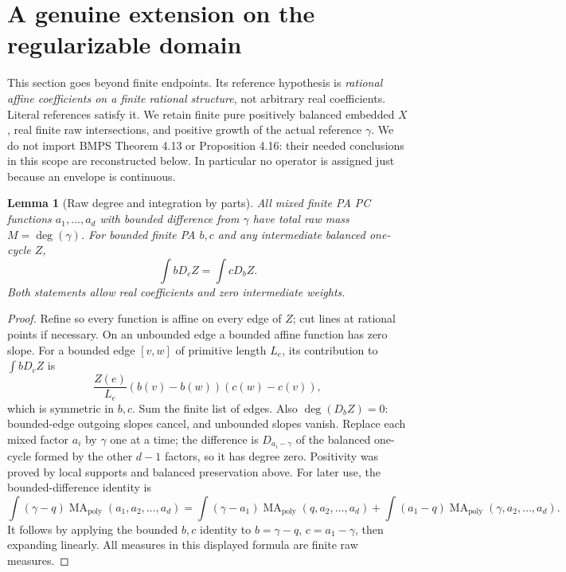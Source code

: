 \documentclass[11pt]{article}
\newtheorem{lemma}[theorem]{Lemma}
\newcommand{\MA}{\operatorname{MA}_{\mathrm{poly}}}
\begin{document}
\section{A genuine extension on the regularizable domain}\label{extension-section}
This section goes beyond finite endpoints. Its reference hypothesis is
\emph{rational affine coefficients on a finite rational structure}, not
arbitrary real coefficients. Literal references satisfy it. We retain
finite pure positively balanced embedded $X$, real finite raw intersections,
and positive growth of the actual reference $\gamma$.
We do not import BMPS Theorem 4.13 or Proposition 4.16: their needed
conclusions in this scope are reconstructed below. In particular no
operator is assigned just because an envelope is continuous.

\begin{lemma}[Raw degree and integration by parts]\label{raw-ibp}
All mixed finite PA PC functions $a_1,\ldots,a_d$ with bounded difference
from $\gamma$ have total raw mass $M=\deg(\gamma)$.
For bounded finite PA $b,c$ and any intermediate balanced one-cycle $Z$,
\[
 \int bD_c Z=\int cD_b Z.
\]
Both statements allow real coefficients and zero intermediate weights.
\end{lemma}
\begin{proof}
Refine so every function is affine on every edge of $Z$; cut lines at
rational points if necessary. On an unbounded edge a bounded affine
function has zero slope. For a bounded edge $[v,w]$ of primitive length
$L_e$, its contribution to $\int bD_c Z$ is
\[
 \frac{Z(e)}{L_e}(b(v)-b(w))(c(w)-c(v)),
\]
which is symmetric in $b,c$. Sum the finite list of edges. Also
$\deg(D_b Z)=0$: bounded-edge outgoing slopes cancel, and unbounded
slopes vanish. Replace each mixed factor $a_i$ by $\gamma$ one at a
time; the difference is $D_{a_i-\gamma}$ of the balanced one-cycle
formed by the other $d-1$ factors, so it has degree zero. Positivity
was proved by local supports and balanced preservation above.
For later use, the bounded-difference identity is
\begin{equation}\label{relative-ibp}
 \int(\gamma-q)\MA(a_1,a_2,\ldots,a_d)
 =\int(\gamma-a_1)\MA(q,a_2,\ldots,a_d)
  +\int(a_1-q)\MA(\gamma,a_2,\ldots,a_d).
\end{equation}
It follows by applying the bounded $b,c$ identity to
$b=\gamma-q$, $c=a_1-\gamma$, then expanding linearly.
All measures in this displayed formula are finite raw measures.
\end{proof}
\end{document}
